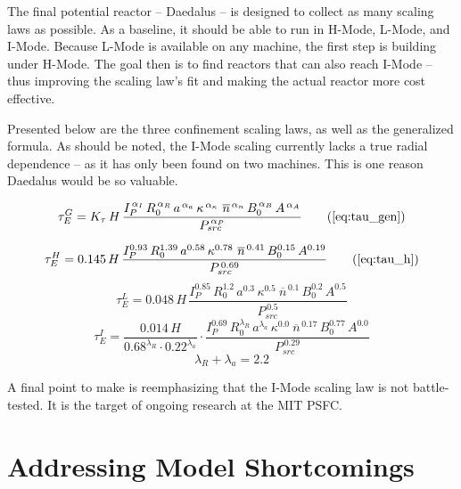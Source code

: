 The final potential reactor -- Daedalus -- is designed to collect as many scaling laws as possible. As a baseline, it should be able to run in H-Mode, L-Mode, and I-Mode. Because L-Mode is available on any machine, the first step is building under H-Mode. The goal then is to find reactors that can also reach I-Mode -- thus improving the scaling law's fit and making the  actual reactor more cost effective.

Presented below are the three confinement scaling laws, as well as the generalized formula. As should be noted, the I-Mode scaling currently lacks a true radial dependence -- as it has only been found on two machines. This is one reason Daedalus would be so valuable.

\begin{equation}
  \tau_E^G = K_\tau \, H \, \frac{
    I_P^{\,\alpha_I} \, R_0^{\,\alpha_R} \, a^{\,\alpha_a} \, \kappa^{\,\alpha_\kappa} \ \overline{n}^{\,\alpha_n} \, B_0^{\,\alpha_B} \, A^{\,\alpha_A}
  }{ P_{src} ^ {\,\alpha_P} }
  \tag{\ref{eq:tau_gen}}
\end{equation}

\begin{equation}
  \tau_E^H = 0.145 \, H \, \frac{
    I_P^{0.93} \, R_0^{1.39} \, a^{0.58} \, \kappa^{0.78} \ \overline{n}^{\, 0.41} \, B_0^{0.15} \, A^{0.19}
  }{ P_{src} ^ {\,0.69} }
  \tag{\ref{eq:tau_h}}
\end{equation}
\begin{equation}
  \tau_E^L = 0.048\, H \, \frac{
    I_P^{0.85} \, R_0^{1.2} \, a^{0.3} \, \kappa^{0.5} \ \overline{n}^{\, 0.1} \, B_0^{0.2} \, A^{0.5} }{ P_{src} ^ {\,0.5} }
\end{equation}
\begin{equation}
  \tau_E^I = \frac{ 0.014 \, H }{ 0.68 ^ {\lambda_R} \cdot 0.22 ^ {\lambda_a} } \cdot \frac{ I_P^{0.69} \, R_0^{\lambda_R} \, a^{\lambda_a} \, \kappa^{0.0} \ \overline{n}^{\, 0.17} \, B_0^{0.77} \, A^{0.0} }{ P_{src} ^ {\,0.29} }
\end{equation}
\begin{equation}
	\lambda_R + \lambda_a = 2.2
\end{equation}

A final point to make is reemphasizing that the I-Mode scaling law is not battle-tested. It is the target of ongoing research at the MIT PSFC.

\section{Addressing Model Shortcomings}

